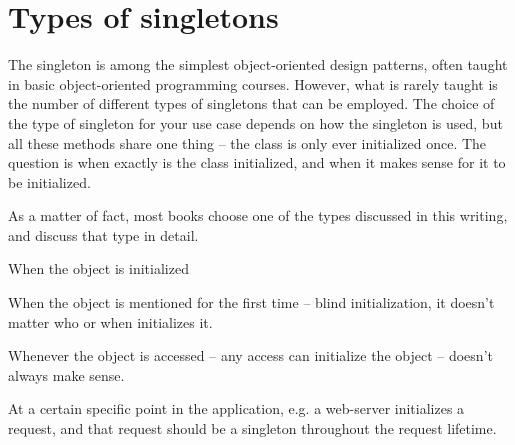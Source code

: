 \section{Types of singletons}

The singleton is among the simplest object-oriented design patterns, often
taught in basic object-oriented programming courses. However, what is rarely
taught is the number of different types of singletons that can be employed. The
choice of the type of singleton for your use case depends on how the singleton
is used, but all these methods share one thing -- the class is only ever
initialized once. The question is when exactly is the class initialized, and
when it makes sense for it to be initialized.

As a matter of fact, most books choose one of the types discussed in this
writing, and discuss that type in detail.

When the object is initialized

When the object is mentioned for the first time -- blind initialization, it doesn't matter who or when initializes it.

Whenever the object is accessed -- any access can initialize the object -- doesn't always make sense.

At a certain specific point in the application, e.g. a web-server initializes a request, and that request should be a singleton throughout the request lifetime.
